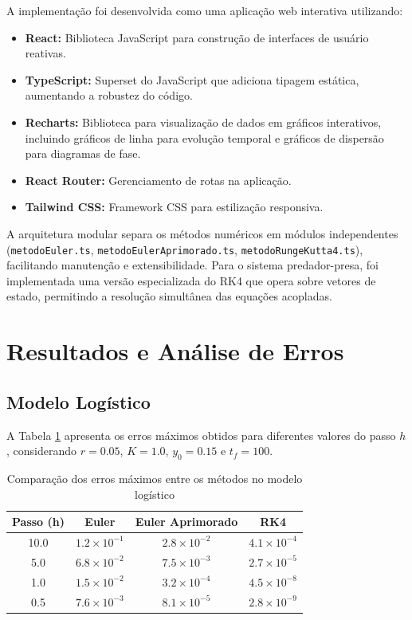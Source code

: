 \documentclass[11pt,a4paper]{article}
\begin{document}
A implementação foi desenvolvida como uma aplicação web interativa utilizando:

\begin{itemize}
    \item \textbf{React:} Biblioteca JavaScript para construção de interfaces de usuário reativas.
    \item \textbf{TypeScript:} Superset do JavaScript que adiciona tipagem estática, aumentando a robustez do código.
    \item \textbf{Recharts:} Biblioteca para visualização de dados em gráficos interativos, incluindo gráficos de linha para evolução temporal e gráficos de dispersão para diagramas de fase.
    \item \textbf{React Router:} Gerenciamento de rotas na aplicação.
    \item \textbf{Tailwind CSS:} Framework CSS para estilização responsiva.
\end{itemize}

A arquitetura modular separa os métodos numéricos em módulos independentes (\texttt{metodoEuler.ts}, \texttt{metodoEulerAprimorado.ts}, \texttt{metodoRungeKutta4.ts}), facilitando manutenção e extensibilidade. Para o sistema predador-presa, foi implementada uma versão especializada do RK4 que opera sobre vetores de estado, permitindo a resolução simultânea das equações acopladas.

\section{Resultados e Análise de Erros}

\subsection{Modelo Logístico}

A Tabela \ref{tab:erros} apresenta os erros máximos obtidos para diferentes valores do passo $h$, considerando $r = 0.05$, $K = 1.0$, $y_0 = 0.15$ e $t_f = 100$.

\begin{table}[H]
\centering
\caption{Comparação dos erros máximos entre os métodos no modelo logístico}
\label{tab:erros}
\begin{tabular}{@{}cccc@{}}
\toprule
\textbf{Passo (h)} & \textbf{Euler} & \textbf{Euler Aprimorado} & \textbf{RK4} \\ \midrule
10.0 & $1.2 \times 10^{-1}$ & $2.8 \times 10^{-2}$ & $4.1 \times 10^{-4}$ \\
5.0  & $6.8 \times 10^{-2}$ & $7.5 \times 10^{-3}$ & $2.7 \times 10^{-5}$ \\
1.0  & $1.5 \times 10^{-2}$ & $3.2 \times 10^{-4}$ & $4.5 \times 10^{-8}$ \\
0.5  & $7.6 \times 10^{-3}$ & $8.1 \times 10^{-5}$ & $2.8 \times 10^{-9}$ \\
\bottomrule
\end{tabular}
\end{table}
\end{document}
